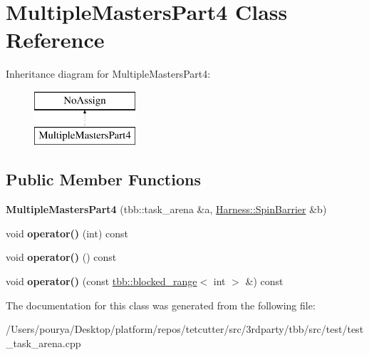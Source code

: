 \hypertarget{classMultipleMastersPart4}{}\section{Multiple\+Masters\+Part4 Class Reference}
\label{classMultipleMastersPart4}
Inheritance diagram for Multiple\+Masters\+Part4\+:\begin{figure}[H]
\begin{center}
\leavevmode
\includegraphics[height=2.000000cm]{classMultipleMastersPart4}
\end{center}
\end{figure}
\subsection*{Public Member Functions}
\begin{DoxyCompactItemize}
\item 
\hypertarget{classMultipleMastersPart4_a5ebff8508bccbed9891ad36a55045423}{}{\bfseries Multiple\+Masters\+Part4} (tbb\+::task\+\_\+arena \&a, \hyperlink{classHarness_1_1SpinBarrier}{Harness\+::\+Spin\+Barrier} \&b)\label{classMultipleMastersPart4_a5ebff8508bccbed9891ad36a55045423}

\item 
\hypertarget{classMultipleMastersPart4_a92b5da5b2be56b5d629c54047a4a5066}{}void {\bfseries operator()} (int) const \label{classMultipleMastersPart4_a92b5da5b2be56b5d629c54047a4a5066}

\item 
\hypertarget{classMultipleMastersPart4_a794ce842468f7679c11388b6362d5928}{}void {\bfseries operator()} () const \label{classMultipleMastersPart4_a794ce842468f7679c11388b6362d5928}

\item 
\hypertarget{classMultipleMastersPart4_af9254d3f06c9cc9db5bbb010f73b965a}{}void {\bfseries operator()} (const \hyperlink{classtbb_1_1blocked__range}{tbb\+::blocked\+\_\+range}$<$ int $>$ \&) const \label{classMultipleMastersPart4_af9254d3f06c9cc9db5bbb010f73b965a}

\end{DoxyCompactItemize}


The documentation for this class was generated from the following file\+:\begin{DoxyCompactItemize}
\item 
/\+Users/pourya/\+Desktop/platform/repos/tetcutter/src/3rdparty/tbb/src/test/test\+\_\+task\+\_\+arena.\+cpp\end{DoxyCompactItemize}
